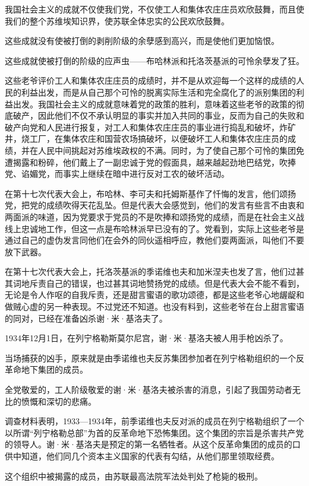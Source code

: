 我国社会主义的成就不仅使我们党，不仅使工人和集体农庄庄员欢欣鼓舞，而且使我们的整个苏维埃知识界，使苏联全体忠实的公民欢欣鼓舞。

这些成就没有使被打倒的剥削阶级的余孽感到高兴，而是使他们更加恼恨。

这些成就使被打倒的阶级的应声虫——布哈林派和托洛茨基派的可怜余孽发了狂。

这些老爷评价工人和集体农庄庄员的成绩时，并不是从欢迎每一个这样的成绩的人民的利益出发，而是从自己那个可怜的脱离实际生活和完全腐化了的派别集团的利益出发。我国社会主义的成就意味着党的政策的胜利，意味着这些老爷的政策的彻底破产，因此他们不仅不承认明显的事实并加入共同的事业，反而为自己的失败和破产向党和人民进行报复，对工人和集体农庄庄员的事业进行捣乱和破坏，炸矿井，烧工厂，在集体农庄和国营农场搞破坏，以便破坏工人和集体农庄庄员的成绩，并在人民中间挑起对苏维埃政权的不满。同时，为了使自己那个可怜的集团免遭揭露和粉碎，他们戴上了一副忠诚于党的假面具，越来越起劲地巴结党，吹捧党、谄媚党，而事实上继续在暗中进行反对工农的破坏活动。

在第十七次代表大会上，布哈林、李可夫和托姆斯基作了忏悔的发言，他们颂扬党，把党的成绩吹得天花乱坠。但是代表大会感觉到，他们的发言有些言不由衷和两面派的味道，因为党要求于党员的不是吹捧和颂扬党的成绩，而是在社会主义战线上忠诚地工作，但这一点是布哈林派早已没有的了。党看到，实际上这些老爷是通过自己的虚伪发言同他们在会外的同伙遥相呼应，教他们耍两面派，叫他们不要放下武器。

在第十七次代表大会上，托洛茨基派的季诺维也夫和加米涅夫也发了言，他们过甚其词地斥责自己的错误，也过甚其词地赞扬党的成绩。但是代表大会不能不看到，无论是令人作呕的自我斥责，还是甜言蜜语的歌功颂德，都是这些老爷心地龌龊和做贼心虚的另一种表现。不过党还不知道。也没有料到，这些老爷在台上甜言蜜语的同对，已经在准备凶杀谢·米·基洛夫了。

1934年12月1日，在列宁格勒斯莫尔尼宫，谢·米·基洛夫被人用手枪凶杀了。

当场捕获的凶手，原来就是由季诺维也夫反苏集团参加者在列宁格勒组织的一个反革命地下集团的成员。

全党敬爱的，工人阶级敬爱的谢·米·基洛夫被杀害的消息，引起了我国劳动者无比的愤慨和深切的悲痛。

调查材料表明，1933—1934年，前季诺维也夫反对派的成员在列宁格勒组织了一个以所谓“列宁格勒总部”为首的反革命地下恐怖集团。这个集团的宗旨是杀害共产党的领导人。谢·米·基洛夫是预定的第一名牺牲者。从这个反革命集团的成员的口供中知道，他们同几个资本主义国家的代表有勾结，从他们那里领取经费。

这个组织中被揭露的成员，由苏联最高法院军法处判处了枪毙的极刑。

